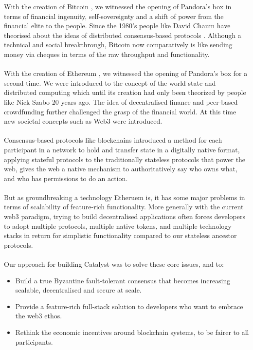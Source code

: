 With the creation of Bitcoin \cite{nakamoto2008bitcoin}, we witnessed the opening of Pandora's box in terms of financial ingenuity, self-sovereignty and a shift of power from the financial elite to the people. Since the 1980's people like David Chaum have theorised about the ideas of distributed consensus-based protocols \cite{chaum1979computer}. Although a technical and social breakthrough, Bitcoin now comparatively is like sending money via cheques in terms of the raw throughput and functionality.
\\\\
With the creation of Ethereum \cite{wood2014ethereum}, we witnessed the opening of Pandora's box for a second time. We were introduced to the concept of the world state and distributed computing which until its creation had only been theorized by people like Nick Szabo 20 years ago. The idea of decentralised finance and peer-based crowdfunding further challenged the grasp of the financial world. At this time new societal concepts such as Web3 were introduced.
\\\\
Consensus-based protocols like blockchains introduced a method for each participant in a network to hold and transfer state in a digitally native format, applying stateful protocols to the traditionally stateless protocols that power the web, gives the web a native mechanism to authoritatively say who owns what, and who has permissions to do an action.
\\\\
But as groundbreaking a technology Etheruem is, it has some major problems in terms of scalability of feature-rich functionality. More generally with the current web3 paradigm, trying to build decentralised applications often forces developers to adopt multiple protocols, multiple native tokens, and multiple technology stacks in return for simplistic functionality compared to our stateless ancestor protocols.
\\\\
Our approach for building Catalyst was to solve these core issues, and to:

\begin{itemize}
\item Build a true Byzantine fault-tolerant consensus that becomes increasing scalable, decentralised and secure at scale.
\item Provide a feature-rich full-stack solution to developers who want to embrace the web3 ethos.
\item Rethink the economic incentives around blockchain systems, to be fairer to all participants.
\end{itemize}


